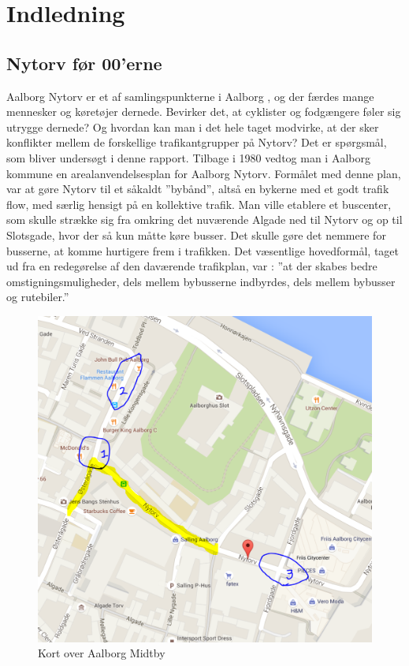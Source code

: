 \chapter{Indledning}
\label{chap:Indledning}

\section{Nytorv før 00'erne}
\label{sec:nytorv_foer_null}
Aalborg Nytorv er et af samlingspunkterne i Aalborg , og der færdes mange mennesker og køretøjer dernede. Bevirker det, at cyklister og fodgængere føler sig utrygge dernede? Og hvordan kan man i det hele taget modvirke, at der sker konflikter mellem de forskellige trafikantgrupper på Nytorv? Det er spørgsmål, som bliver undersøgt i denne rapport.
Tilbage i 1980 vedtog man i Aalborg kommune en arealanvendelsesplan for Aalborg Nytorv.
Formålet med denne plan, var at gøre Nytorv til et såkaldt ”bybånd”, altså en bykerne med et godt trafik flow, med særlig hensigt på en kollektive trafik. Man ville etablere et buscenter, som skulle strække sig fra omkring det nuværende Algade ned til Nytorv og op til Slotsgade, hvor der så kun måtte køre busser. Det skulle gøre det nemmere for busserne, at komme hurtigere frem i trafikken. Det  væsentlige hovedformål, taget ud fra en redegørelse af den daværende trafikplan, var :
”at der skabes bedre omstigningsmuligheder, dels mellem bybusserne     indbyrdes, dels mellem bybusser og rutebiler.” \cite{datasheet_pir1}
\begin{figure}
\centering
\includegraphics[scale=0.5]{opserveringspunkter2.PNG}
\caption{Kort over Aalborg Midtby}
\end{figure}
